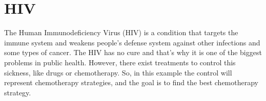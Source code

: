 \section{HIV}
    The Human Immunodeficiency Virus (HIV) is a condition that targets the 
    immune system and weakens people's defense system against other infections 
    and some types of cancer. The HIV has no cure and that's why it is one of 
    the biggest problems in public health. However, there exist treatments to 
    control this sickness, like drugs or chemotherapy. So, in this example
    the control will represent chemotherapy strategies, and the goal is to find 
    the  best chemotherapy strategy. 
    
